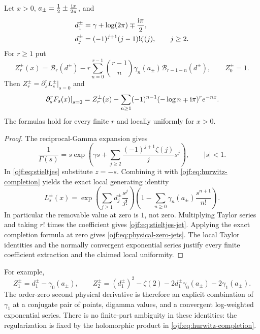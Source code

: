 \begin{theorem}
\label{ojf:thm:stieltjes}
Let $x>0$, $a_\pm=\frac12\pm\frac{\mathrm{i} x}{2\pi}$, and
\begin{align}
 d_1^\pm&=\gamma+\log(2\pi)\mp\frac{\mathrm{i}\pi}{2},\label{ojf:eq:dj}\\
 d_j^\pm&=(-1)^{j+1}(j-1)!\zeta(j),\qquad j\ge2.\notag
\end{align}
For $r\ge1$ put
\begin{equation}\label{ojf:eq:stieltjes-jet}
 Z_r^\pm(x)=\mathcal{B}_r(d^\pm)
       -r\sum_{n=0}^{r-1}\binom{r-1}{n}
                    \gamma_n(a_\pm)\mathcal{B}_{r-1-n}(d^\pm),
 \qquad Z_0^\pm=1.
\end{equation}
Then $Z_r^\pm=\partial_s^rL_s^\pm|_{s=0}$ and
\begin{equation}\label{ojf:eq:physical-zero-jets}
 \left.\partial_s^rF_s(x)\right|_{s=0}
  =Z_r^\pm(x)-\sum_{n\ge1}(-1)^{n-1}
                     (-\log n\mp\mathrm{i}\pi)^re^{-nx}.
\end{equation}
The formulas hold for every finite $r$ and locally uniformly for $x>0$.
\end{theorem}

\begin{proof}
The reciprocal-Gamma expansion \cite[\S5.7]{ojf:DLMFGamma} gives
\[
 \frac1{\Gamma(s)}=s\exp\left(\gamma s+
           \sum_{j\ge2}\frac{(-1)^{j+1}\zeta(j)}j s^j\right),
 \qquad |s|<1.
\]
In \eqref{ojf:eq:stieltjes} substitute $z=-s$. Combining it with
\eqref{ojf:eq:hurwitz-completion} yields the exact local generating
identity
\begin{equation}\label{ojf:eq:stieltjes-generating}
 L_s^\pm(x)=
 \exp\left(\sum_{j\ge1}d_j^\pm\frac{s^j}{j!}\right)
       \left(1-\sum_{n\ge0}\gamma_n(a_\pm)\frac{s^{n+1}}{n!}\right).
\end{equation}
In particular the removable value at zero is $1$, not zero. Multiplying
Taylor series and taking $r!$ times the coefficient gives
\eqref{ojf:eq:stieltjes-jet}. Applying the exact completion formula at
zero gives \eqref{ojf:eq:physical-zero-jets}. The local Taylor identities
and the normally convergent exponential series justify every finite
coefficient extraction and the claimed local uniformity.
\end{proof}

For example,
\[
 Z_1^\pm=d_1^\pm-\gamma_0(a_\pm),\qquad
 Z_2^\pm=(d_1^\pm)^2-\zeta(2)
                   -2d_1^\pm\gamma_0(a_\pm)-2\gamma_1(a_\pm).
\]
The order-zero second physical derivative is therefore an explicit
combination of $\gamma_1$ at a conjugate pair of points, digamma values,
and a convergent log-weighted exponential series. There is no finite-part
ambiguity in these identities: the regularization is fixed by the
holomorphic product in \eqref{ojf:eq:hurwitz-completion}.

